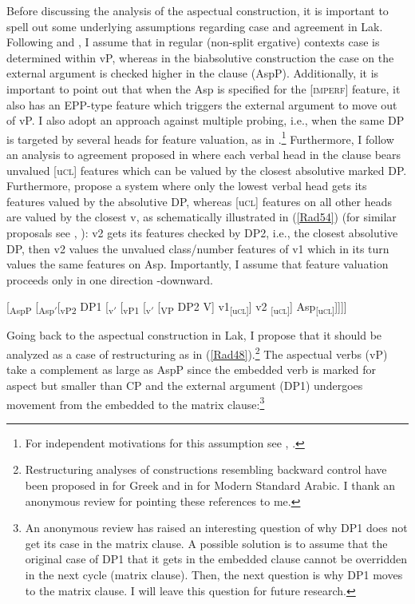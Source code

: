 \documentclass[output=paper]{langscibook}
\begin{document}
Before discussing the analysis of the aspectual construction, it is important to spell out some underlying assumptions regarding case and agreement in Lak. Following \cite{GagliardiRadkevich2014} and \citet{Radkevich2017},  I assume that in regular (non-split ergative) contexts  case is determined within vP, whereas in the biabsolutive construction the case on the external argument is checked higher in the clause (AspP). Additionally, it is important to point out that when the Asp is specified for the [\textsc{imperf}] feature, it also has an EPP-type feature which triggers the external argument to move out of vP. I also adopt an approach against multiple probing, i.e., when the same DP is targeted by several heads for feature valuation, as in \citet{PolinskyChumakina2017}.\footnote{For independent motivations for this assumption see \cite{Rezac2003}, \cite{BakerWillie2010}.} Furthermore, I follow an analysis to agreement proposed in \citet{PolinskyChumakina2017} where each verbal head in the clause bears unvalued [u\textsc{cl}] features which can be valued by the closest absolutive marked DP. Furthermore, \citet{PolinskyChumakina2017} propose a system where only the lowest verbal head gets its features valued by the absolutive DP, whereas [u\textsc{cl}] features on all other heads are valued by the closest v, as schematically illustrated in (\ref{Rad54}) (for similar proposals see \citealt{Collins2003}, \citealt{BakerWillie2010}): v2 gets its features checked by DP2, i.e., the closest absolutive DP, then v2 values the unvalued class/number features of v1 which in its turn values the same features on Asp. Importantly, I assume that feature valuation proceeds only in one direction -downward.


\ea\label{Rad54}

[\textsubscript{AspP} [\textsubscript{Asp$'$}[\textsubscript{vP2} DP1 [\textsubscript{v$'$} [\textsubscript{vP1} [\textsubscript{v$'$} [\textsubscript{VP} DP2 V]  v1\textsubscript{[u\textsc{cl}]}] v2 \textsubscript{[u\textsc{cl}]}] Asp\textsubscript{[u\textsc{cl}]}]]]]\\
\z

Going back to the aspectual construction in Lak, I propose that it should be analyzed as a case of restructuring as in (\ref{Rad48}).\footnote{Restructuring analyses of constructions resembling backward control have been proposed in \cite{Roussou2009} for Greek and in \cite{GreshlerWintner2017} for Modern Standard Arabic. I thank an anonymous review for pointing these references to me.} The aspectual verbs (vP) take a complement as large as AspP since the embedded verb is marked for aspect but smaller than CP and the external argument (DP1) undergoes movement from the embedded to the matrix clause:\footnote{An anonymous review has raised an interesting question of why DP1 does not get its case in the matrix clause. A possible solution is to assume that the original case of DP1 that it gets in the embedded clause cannot be overridden in the next cycle (matrix clause). Then, the next question is why DP1 moves to the matrix clause. I will leave this question for future research.}
\end{document}
